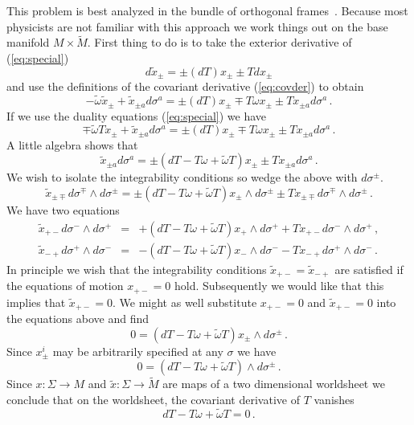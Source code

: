 \documentclass[a4paper,12pt]{article}
\newcommand{\Mtil}{\widetilde{M}}
\newcommand{\omegatil}{\tilde{\omega}}
\newcommand{\xtil}{\tilde{x}}
\begin{document}
This problem is best analyzed in the bundle of orthogonal
frames~\cite{Alvarez:psd2}.  Because most physicists are not familiar
with this approach we work things out on the base manifold
$M\times\Mtil$.  First thing to do is to take the exterior derivative
of (\ref{eq:special})
$$
    d\xtil_{\pm} = \pm (dT) x_{\pm} \pm T dx_{\pm}
$$
and use the definitions of the covariant derivative (\ref{eq:covder}) 
to obtain
$$
    -\omegatil \xtil_{\pm} + \xtil_{\pm a}d\sigma^{a}
    = \pm (dT) x_{\pm} \mp T \omega x_{\pm}
    \pm T x_{\pm a} d\sigma^{a}\,.
$$
If we use the duality equations (\ref{eq:special}) we have
$$
    \mp \omegatil T x_{\pm} + \xtil_{\pm a}d\sigma^{a}
    = \pm (dT) x_{\pm} \mp T \omega x_{\pm}
    \pm T x_{\pm a} d\sigma^{a}\,.
$$
A little algebra shows that
\begin{equation}
     \xtil_{\pm a}d\sigma^{a}
    = \pm (dT  -  T \omega  + \omegatil T)x_{\pm}
    \pm T x_{\pm a} d\sigma^{a}\,.   
    \label{eq:pseudodual}
\end{equation}
We wish to isolate the integrability conditions so wedge the above 
with $d\sigma^{\pm}$.
$$
     \xtil_{\pm \mp}d\sigma^{\mp} \wedge d\sigma^{\pm}
    = \pm (dT  -  T \omega  + \omegatil T)x_{\pm} \wedge d\sigma^{\pm}
    \pm T x_{\pm \mp} d\sigma^{\mp} \wedge d\sigma^{\pm}\,.   
$$
We have two equations
\begin{eqnarray*}
     \xtil_{+ -}d\sigma^{-} \wedge d\sigma^{+}
    &=& + (dT  -  T \omega  + \omegatil T)x_{+} \wedge d\sigma^{+}
    + T x_{+ -} d\sigma^{-} \wedge d\sigma^{+}\,,   \\
     \xtil_{- +}d\sigma^{+} \wedge d\sigma^{-}
    &=& - (dT  -  T \omega  + \omegatil T)x_{-} \wedge d\sigma^{-}
    - T x_{- +} d\sigma^{+} \wedge d\sigma^{-}\,.   
\end{eqnarray*}
In principle we wish that the integrability conditions
$\xtil_{+-}=\xtil_{-+}$ are satisfied if the equations of motion
$x_{+-}=0$ hold.  Subsequently we would like that this implies that
$\xtil_{+-}=0$.  We might as well substitute $x_{+-}=0$ and
$\xtil_{+-}=0$ into the equations above and find
$$
    0 = (dT - T \omega + \omegatil T)x_{\pm}\wedge
    d\sigma^{\pm}\,.
$$
Since $x^{i}_{\pm}$ may be  arbitrarily specified at any $\sigma$ we 
have
$$
    0 = (dT - T \omega + \omegatil T)\wedge d\sigma^{\pm}\,.    
$$
Since $x:\Sigma\to M$ and $\xtil:\Sigma\to\Mtil$ are maps of a two 
dimensional worldsheet we conclude that on the worldsheet, the 
covariant derivative of $T$ vanishes
\begin{equation}
    dT - T \omega + \omegatil T =0\,.    
    \label{eq:covT}
\end{equation}
\end{document}
